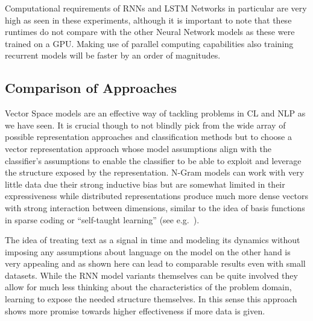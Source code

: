 Computational requirements of \glspl{RNN} and LSTM Networks in particular are very high as seen in these experiments, although it is important to note that these runtimes do not compare with the other Neural Network models as these were trained on a \gls{GPU}. Making use of parallel computing capabilities also training recurrent models will be faster by an order of magnitudes.

\subsection{Comparison of Approaches}

Vector Space models are an effective way of tackling problems in \gls{CL} and \gls{NLP} as we have seen. It is crucial though to not blindly pick from the wide array of possible representation approaches and classification methods but to choose a vector representation approach whose model assumptions align with the classifier's assumptions to enable the classifier to be able to exploit and leverage the structure exposed by the representation. N-Gram models can work with very little data due their strong inductive bias but are somewhat limited in their expressiveness while distributed representations produce much more dense vectors with strong interaction between dimensions, similar to the idea of basis functions in sparse coding or ``self-taught learning'' (see e.g.~\cite{Raina:2007aa}). 

The idea of treating text as a signal in time and modeling its dynamics without imposing any assumptions about language on the model on the other hand is very appealing and as shown here can lead to comparable results even with small datasets. While the \gls{RNN} model variants themselves can be quite involved they allow for much less thinking about the characteristics of the problem domain, learning to expose the needed structure themselves. In this sense this approach shows more promise towards higher effectiveness if more data is given.
